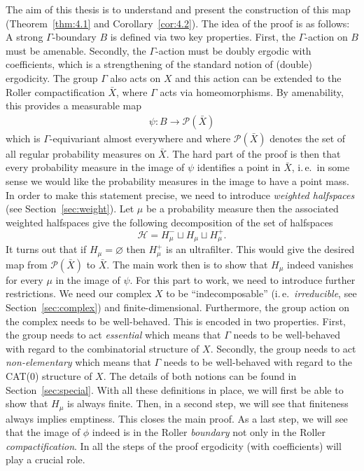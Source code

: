 The aim of this thesis is to understand and present the construction of this map (Theorem~\ref{thm:4.1} and Corollary~\ref{cor:4.2}). The idea of the proof is as follows: A strong \(\Gamma\)-boundary \(B\) is defined via two key properties. First, the \(\Gamma\)-action on \(B\) must be amenable. Secondly, the \(\Gamma\)-action must be doubly ergodic with coefficients, which is a strengthening of the standard notion of (double) ergodicity. The group \(\Gamma\) also acts on \(X\) and this action can be extended to the Roller compactification \(\bar X\), where \(\Gamma\) acts via homeomorphisms. By amenability, this provides a measurable map
\begin{align}
  \psi\colon B \to \mathcal{P}(\bar X)\label{eq:psi}
\end{align}
which is \(\Gamma\)-equivariant almost everywhere and where \(\mathcal{P}(\bar X)\) denotes the set of all regular probability measures on \(\bar X\). The hard part of the proof is then that every probability measure in the image of \(\psi\) identifies a point in \(\bar X\), i.\,e.\ in some sense we would like the probability measures in the image to have a point mass. In order to make this statement precise, we need to introduce \emph{weighted halfspaces} (see Section~\ref{sec:weight}). Let \(\mu\) be a probability measure then the associated weighted halfspaces give the following decomposition of the set of halfspaces
\[
\mathcal{H} = H_\mu^- \sqcup H_\mu \sqcup H_\mu^+.
\]
It turns out that if \(H_\mu = \varnothing\) then \(H_\mu^+\) is an ultrafilter. This would give the desired map from \(\mathcal{P}(\bar X)\) to \(\bar X\). The main work then is to show that \(H_\mu\) indeed vanishes for every \(\mu\) in the image of \(\psi\). For this part to work, we need to introduce further restrictions. We need our complex \(X\) to be \enquote{indecomposable} (i.\,e.\ \emph{irreducible}, see Section~\ref{sec:complex}) and finite-dimensional. Furthermore, the group action on the complex needs to be well-behaved. This is encoded in two properties. First, the group needs to act \emph{essential} which means that \(\Gamma\) needs to be well-behaved with regard to the combinatorial structure of \(X\). Secondly, the group needs to act \emph{non-elementary} which means that \(\Gamma\) needs to be well-behaved with regard to the CAT(0) structure of \(X\). The details of both notions can be found in Section~\ref{sec:special}. With all these definitions in place, we will first be able to show that \(H_\mu\) is always finite. Then, in a second step, we will see that finiteness always implies emptiness. This closes the main proof. As a last step, we will see that the image of \(\phi\) indeed is in the Roller \emph{boundary} not only in the Roller \emph{compactification}. In all the steps of the proof ergodicity (with coefficients) will play a crucial role.


